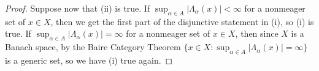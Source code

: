 \documentclass[11pt,oneside,english]{amsart}
\theoremstyle{definition}
\begin{document}
\begin{enumerate}
\begin{proof}
Suppose now that (ii) is true. If $\sup_{\alpha\in A}|\Lambda_\alpha(x)|<\infty$ for a nonmeager set of $x\in X$, then we get the first part of the disjunctive statement in (i), so (i) is true. If $\sup_{\alpha\in A}|\Lambda_\alpha(x)|=\infty$ for a nonmeager set of $x\in X$, then since $X$ is a Banach space, by the Baire Category Theorem $\{x\in X: \sup_{\alpha\in A}|\Lambda_\alpha(x)|=\infty\}$ is a generic set, so we have (i) true again.
\end{proof}




\end{enumerate}
\end{document}
